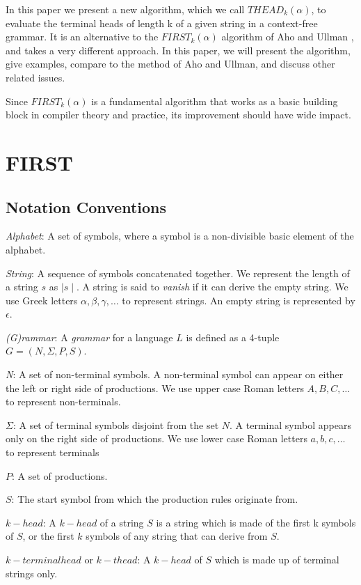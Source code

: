 \documentclass{sig-alternate-05-2015}
\begin{document}
In this paper we present a new algorithm, which we call
$THEAD_k(\alpha)$, to evaluate the terminal heads of length k of a
given string in a context-free grammar. It is an alternative
to the $FIRST_k(\alpha)$ algorithm of Aho and Ullman \cite{aho72parsing}, and
takes a very different approach. In this paper, we will present
the algorithm, give examples, compare to the method
of Aho and Ullman, and discuss other related issues.

Since $FIRST_k(\alpha)$ is a fundamental algorithm that works
as a basic building block in compiler theory and practice,
its improvement should have wide impact.

\section{FIRST}
\subsection{Notation Conventions}
\textit{Alphabet}: A set of symbols, where a symbol is a
non-divisible basic element of the alphabet.

\textit{String}: A sequence of symbols concatenated together.
We represent the length of a string $s$ as $\mid s \mid$. A string is said to \textit{vanish} if it can derive the empty
string. We use Greek letters $\alpha, \beta, \gamma, \ldots$ to represent strings. An empty string is represented by $\epsilon$.

\textit{(G)rammar}: A \textit{grammar} for a language $L$ is defined as a 4-tuple $G = (N, \Sigma, P, S)$. 

\textit{N}: A set of non-terminal symbols. A non-terminal symbol can appear on either the
left or right side of productions. We use upper case Roman letters $A, B, C, \ldots$ to represent
non-terminals.

$\Sigma$: A set of terminal symbols disjoint from the set $N$. A terminal symbol appears only on the right side of productions.
We use lower case Roman letters $a, b, c, \ldots$ to represent terminals

$P$: A set of productions.

$S$: The start symbol from which the production rules originate from.

$k-head$: A $k-head$ of a string $S$ is a string which is made of the
first k symbols of $S$, or the first $k$ symbols of any string
that can derive from $S$. 

$k-terminal head$ or $k-thead$: A $k-head$ of $S$ which is made up of terminal strings only.
\end{document}
